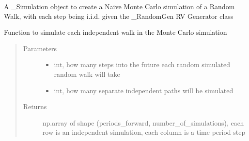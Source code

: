 \documentclass[letterpaper,10pt,english]{sphinxmanual}
\begin{document}

\begin{fulllineitems}
\label{\detokenize{simulation:risk_dash.simgen.NaiveMonteCarlo}}
\sphinxAtStartPar
A \_Simulation object to create a Naive Monte Carlo simulation of a Random Walk, with each step being i.i.d. given the \_RandomGen RV Generator class

\begin{fulllineitems}
\label{\detokenize{simulation:risk_dash.simgen.NaiveMonteCarlo.simulate}}
\sphinxAtStartPar
Function to simulate each independent walk in the Monte Carlo simulation
\begin{quote}\begin{description}
\item[{Parameters}] \leavevmode\begin{itemize}
\item {} 
\sphinxAtStartPar
{} \textendash{} int, how many steps into the future each random simulated random walk will take

\item {} 
\sphinxAtStartPar
{} \textendash{} int, how many separate independent paths will be simulated

\end{itemize}

\item[{Returns}] \leavevmode
\sphinxAtStartPar
np.array of shape (periods\_forward, number\_of\_simulations), each row is an independent simulation, each column is a time period step

\end{description}\end{quote}

\end{fulllineitems}


\end{fulllineitems}
\end{document}
